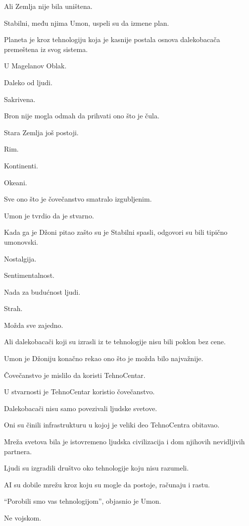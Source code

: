 Ali Zemlja nije bila uništena.

Stabilni, među njima Umon, uspeli su da izmene plan.

Planeta je kroz tehnologiju koja je kasnije postala osnova dalekobacača premeštena iz svog sistema.

U Magelanov Oblak.

Daleko od ljudi.

Sakrivena.

\bigskip

Bron nije mogla odmah da prihvati ono što je čula.

Stara Zemlja još postoji.

Rim.

Kontinenti.

Okeani.

Sve ono što je čovečanstvo smatralo izgubljenim.

Umon je tvrdio da je stvarno.

Kada ga je Džoni pitao zašto su je Stabilni spasli, odgovori su bili tipično umonovski.

Nostalgija.

Sentimentalnost.

Nada za budućnost ljudi.

Strah.

Možda sve zajedno.

\bigskip

Ali dalekobacači koji su izrasli iz te tehnologije nisu bili poklon bez cene.

Umon je Džoniju konačno rekao ono što je možda bilo najvažnije.

Čovečanstvo je mislilo da koristi TehnoCentar.

U stvarnosti je TehnoCentar koristio čovečanstvo.

Dalekobacači nisu samo povezivali ljudske svetove.

Oni su činili infrastrukturu u kojoj je veliki deo TehnoCentra obitavao.

Mreža svetova bila je istovremeno ljudska civilizacija i dom njihovih nevidljivih partnera.

Ljudi su izgradili društvo oko tehnologije koju nisu razumeli.

AI su dobile mrežu kroz koju su mogle da postoje, računaju i rastu.

\bigskip

``Porobili smo vas tehnologijom'', objasnio je Umon.

Ne vojskom.

